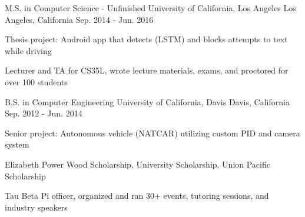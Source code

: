 

\begin{cventries}

  \cventry
    {M.S. in Computer Science - Unfinished} %
    {University of California, Los Angeles} %
    {Los Angeles, California} %
    {Sep. 2014 - Jun. 2016} %
    {} %
    {
        \begin{cvitems} %
        \item {Thesis project: Android app that detects (LSTM) and blocks attempts to text while driving}
        \item {Lecturer and TA for CS35L, wrote lecture materials, exams, and proctored for over 100 students}
        \end{cvitems}
    }


  \cventry
    {B.S. in Computer Engineering} %
    {University of California, Davis} %
    {Davis, California} %
    {Sep. 2012 - Jun. 2014} %
    {} %
    {
      \begin{cvitems} %
        \item {Senior project: Autonomous vehicle (NATCAR) utilizing custom PID and camera system}
        \item {Elizabeth Power Wood Scholarship, University Scholarship, Union Pacific Scholarship}
        \item {Tau Beta Pi officer, organized and ran 30+ events, tutoring sessions, and industry speakers}
      \end{cvitems}
    }
\end{cventries}
